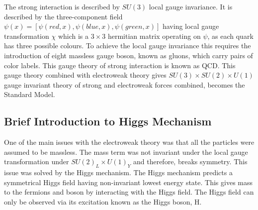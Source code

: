 
The strong interaction is described by $SU(3)$ local gauge invariance. It is described by the three-component field $\psi(x)=[\psi(red,x),\psi(blue,x),\psi(green,x)]$ having local gauge transformation $\chi$ which is a $3\times 3$ hermitian matrix operating on $\psi$, as each quark has three possible colours. To achieve the local gauge invariance this requires the introduction of eight massless gauge boson, known as gluons, which carry pairs of color labels. This gauge theory of strong interaction is known as QCD. This gauge theory combined with electroweak theory gives $SU(3)\times SU(2) \times U(1)$ gauge invariant theory of strong and electroweak forces combined, becomes the Standard Model.






\subsection{Brief Introduction to Higgs Mechanism} %
\label{sub:brief_introduction_to_higgs_mechanism}
One of the main issues with the electroweak theory was that all the particles were assumed to be massless.
The mass term was not invariant under the local gauge transformation under $SU(2)_L \times U(1)_Y$ and therefore, breaks symmetry.
This issue was solved by the Higgs mechanism.
The Higgs mechanism predicts a symmetrical Higgs field having non-invariant lowest energy state. This gives mass to the fermions and boson by interacting with the Higgs field. The Higgs field can only be observed via its excitation known as the Higgs boson, H.

